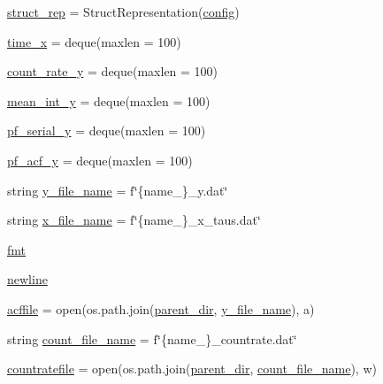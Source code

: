 \begin{DoxyCompactItemize}
\item 
\hyperlink{namespacephoton__statistics_a1a182b084119bc408c9fbae7b462acc3}{struct\+\_\+rep} = Struct\+Representation(\hyperlink{namespacephoton__statistics_a4176c548148b1c86da6ddf320ab00e90}{config})
\item 
\hyperlink{namespacephoton__statistics_a718548ec119098f106f9ff9f31b409bf}{time\+\_\+x} = deque(maxlen = 100)
\item 
\hyperlink{namespacephoton__statistics_a9939968ed5be4ad1c5c6264ed0a875e9}{count\+\_\+rate\+\_\+y} = deque(maxlen = 100)
\item 
\hyperlink{namespacephoton__statistics_a5394aea076650f9894b4cb28977546d5}{mean\+\_\+int\+\_\+y} = deque(maxlen = 100)
\item 
\hyperlink{namespacephoton__statistics_a397e27175ec763175de0a4b04e9beb75}{pf\+\_\+serial\+\_\+y} = deque(maxlen = 100)
\item 
\hyperlink{namespacephoton__statistics_ada08824fb72ac8fb00ca57eb5ffa0a59}{pf\+\_\+acf\+\_\+y} = deque(maxlen = 100)
\item 
string \hyperlink{namespacephoton__statistics_af562d689a2b300926d155fb601e925ae}{y\+\_\+file\+\_\+name} = f\char`\"{}\{name\+\_\+\}\+\_\+y.\+dat\char`\"{}
\item 
string \hyperlink{namespacephoton__statistics_ac46f5d89cfe3237a86a586214643616d}{x\+\_\+file\+\_\+name} = f\char`\"{}\{name\+\_\+\}\+\_\+x\+\_\+taus.\+dat\char`\"{}
\item 
\hyperlink{namespacephoton__statistics_a0e1aee8b528dd37bb27185509aa5af09}{fmt}
\item 
\hyperlink{namespacephoton__statistics_a6c6d01b62f113634193642d2dda3124a}{newline}
\item 
\hyperlink{namespacephoton__statistics_ad37c8420c6a43ec4997809c4c236b145}{acffile} = open(os.\+path.\+join(\hyperlink{namespacephoton__statistics_a255f06b87745f05837e1623b921ae692}{parent\+\_\+dir}, \hyperlink{namespacephoton__statistics_af562d689a2b300926d155fb601e925ae}{y\+\_\+file\+\_\+name}), \textquotesingle{}a\textquotesingle{})
\item 
string \hyperlink{namespacephoton__statistics_aefac3a6449e578f00a5870a4249bf7ea}{count\+\_\+file\+\_\+name} = f\char`\"{}\{name\+\_\+\}\+\_\+countrate.\+dat\char`\"{}
\item 
\hyperlink{namespacephoton__statistics_af015eefc8f4b272cae12b376618be9dc}{countratefile} = open(os.\+path.\+join(\hyperlink{namespacephoton__statistics_a255f06b87745f05837e1623b921ae692}{parent\+\_\+dir}, \hyperlink{namespacephoton__statistics_aefac3a6449e578f00a5870a4249bf7ea}{count\+\_\+file\+\_\+name}), \textquotesingle{}w\textquotesingle{})

\end{DoxyCompactItemize}
